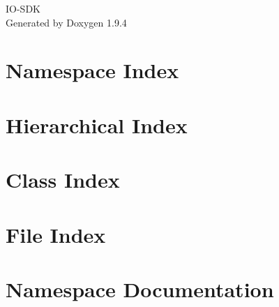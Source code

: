 \documentclass[twoside]{book}
\newcommand{\+}{\discretionary{\mbox{\scriptsize$\hookleftarrow$}}{}{}}
\newcommand{\clearemptydoublepage}{%
    \newpage{\pagestyle{empty}\cleardoublepage}%
  }
\begin{document}
  \raggedbottom
    \hypersetup{pageanchor=false,
                bookmarksnumbered=true,
                pdfencoding=unicode
               }
  \begin{titlepage}
  \vspace*{7cm}
  \begin{center}%
  {\Large IO-\/\+SDK}\\
  \vspace*{1cm}
  {\large Generated by Doxygen 1.9.4}\\
  \end{center}
  \end{titlepage}
  \clearemptydoublepage
  \tableofcontents
  \clearemptydoublepage
  \hypersetup{pageanchor=true}
\chapter{Namespace Index}

\chapter{Hierarchical Index}

\chapter{Class Index}

\chapter{File Index}

\chapter{Namespace Documentation}



























\end{document}
